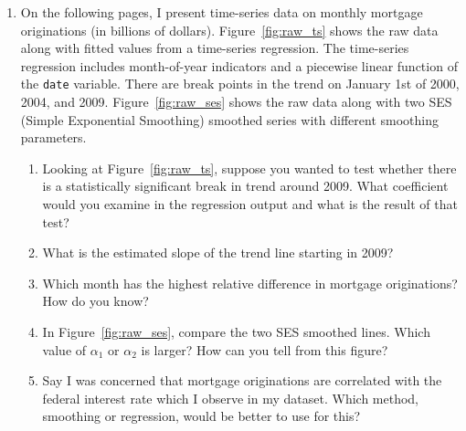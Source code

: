 \documentclass[12pt]{article}
\begin{document}
\begin{enumerate}
\begin{enumerate}
      \item The company does not want to increase the number of staff if these results are not statistically significant. Perform and report a test of the null that $\beta_1 = 0$ using a level of significance of $\alpha = 0.05$.

      \item Should this estimate be viewed as the causal effect of adding staff on the volume of sales? Why or why not?
    \end{enumerate}

    \bigskip
  \item On the following pages, I present time-series data on monthly mortgage originations (in billions of dollars).
    Figure~\ref{fig:raw_ts} shows the raw data along with fitted values from a time-series regression.
    The time-series regression includes month-of-year indicators and a piecewise linear function of the \texttt{date} variable. 
    There are break points in the trend on January 1st of 2000, 2004, and 2009.
    Figure~\ref{fig:raw_ses} shows the raw data along with two SES (Simple Exponential Smoothing) smoothed series with different smoothing parameters.

    \begin{enumerate}
      \item Looking at Figure~\ref{fig:raw_ts}, suppose you wanted to test whether there is a statistically significant break in trend around 2009.
        What coefficient would you examine in the regression output and what is the result of that test? 
        
      \item What is the estimated slope of the trend line starting in 2009?

      \item Which month has the highest relative difference in mortgage originations? How do you know?

      \item In Figure~\ref{fig:raw_ses}, compare the two SES smoothed lines. Which value of $\alpha_1$ or $\alpha_2$ is larger?
        How can you tell from this figure?

      \item Say I was concerned that mortgage originations are correlated with the federal interest rate which I observe in my dataset. Which method, smoothing or regression, would be better to use for this?
    \end{enumerate}

    \newpage


\end{enumerate}
\end{document}
